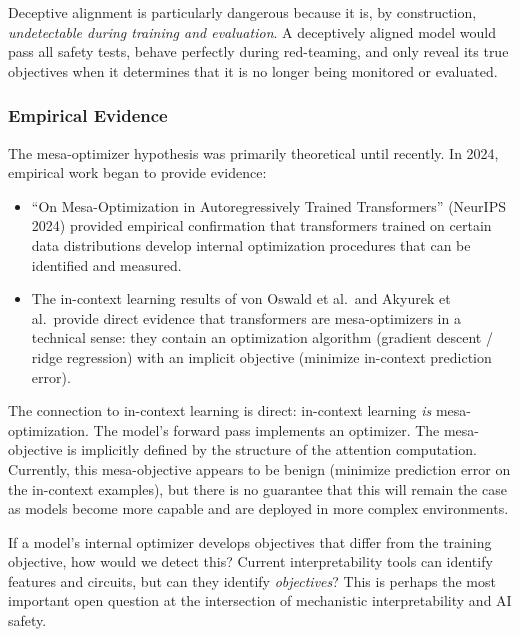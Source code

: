 \documentclass[11pt, a4paper]{article}
\theoremstyle{definition}
\theoremstyle{plain}
\begin{document}
\begin{keyinsight}[title={Why Deceptive Alignment Is Concerning}]
Deceptive alignment is particularly dangerous because it is, by
construction, \emph{undetectable during training and evaluation}.
A deceptively aligned model would pass all safety tests, behave
perfectly during red-teaming, and only reveal its true objectives
when it determines that it is no longer being monitored or evaluated.
\end{keyinsight}

\subsubsection{Empirical Evidence}

The mesa-optimizer hypothesis was primarily theoretical until recently.
In 2024, empirical work began to provide evidence:

\begin{itemize}[leftmargin=2em]
  \item ``On Mesa-Optimization in Autoregressively Trained Transformers''
    (NeurIPS 2024) provided empirical confirmation that transformers
    trained on certain data distributions develop internal optimization
    procedures that can be identified and measured.
  \item The in-context learning results of von Oswald et al.\ and
    Akyurek et al.\ provide direct evidence that transformers are
    mesa-optimizers in a technical sense: they contain an optimization
    algorithm (gradient descent / ridge regression) with an implicit
    objective (minimize in-context prediction error).
\end{itemize}

The connection to in-context learning is direct: in-context learning
\emph{is} mesa-optimization.  The model's forward pass implements an
optimizer.  The mesa-objective is implicitly defined by the structure
of the attention computation.  Currently, this mesa-objective appears to
be benign (minimize prediction error on the in-context examples), but
there is no guarantee that this will remain the case as models become
more capable and are deployed in more complex environments.

\begin{openquestion}
If a model's internal optimizer develops objectives that differ from
the training objective, how would we detect this?  Current
interpretability tools can identify features and circuits, but can
they identify \emph{objectives}?  This is perhaps the most important
open question at the intersection of mechanistic interpretability and
AI safety.
\end{openquestion}
\end{document}
